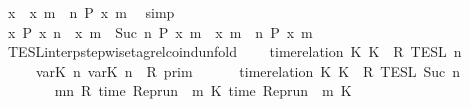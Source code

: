 \begin{isabellebody}
\ {\isacartoucheopen}x\ {\isasymin}\ {\isacharbraceleft}x{\isachardot}\ {\isasymforall}m\ {\isasymge}\ n{\isachardot}\ P\ x\ m{\isacharbraceright}{\isacartoucheclose}\ \isamarkupfalse%
\ simp\isanewline
\ \ \isacommand{{\isacharbraceright}}\isamarkupfalse%
\ \isamarkupfalse%
\ {\isacartoucheopen}{\isacharbraceleft}x{\isachardot}\ P\ x\ n{\isacharbraceright}\ {\isasyminter}\ {\isacharbraceleft}x{\isachardot}\ {\isasymforall}m\ {\isasymge}\ Suc\ n{\isachardot}\ P\ x\ m{\isacharbraceright}\ {\isasymsubseteq}\ {\isacharbraceleft}x{\isachardot}\ {\isasymforall}m\ {\isasymge}\ n{\isachardot}\ P\ x\ m{\isacharbraceright}{\isacartoucheclose}\ \isacommand{{\isachardot}{\isachardot}}\isamarkupfalse%
\isanewline
{}\isamarkupfalse%
%
\endisatagproof
{\isafoldproof}%
%
\isadelimproof
\isanewline
%
\endisadelimproof
\isanewline
{}\isamarkupfalse%
\ TESL{\isacharunderscore}interp{\isacharunderscore}stepwise{\isacharunderscore}tagrel{\isacharunderscore}coind{\isacharunderscore}unfold{\isacharcolon}\isanewline
\ \ \ {\isacartoucheopen}{\isasymlbrakk}\ time{\isacharminus}relation\ {\isasymlfloor}K\ K\ {\isasymin}\ R\ {\isasymrbrakk}\isactrlsub T\isactrlsub E\isactrlsub S\isactrlsub L\isactrlbsup {\isasymge}\ n\isactrlesup \ {\isacharequal}\isanewline
\ \ \ \ {\isasymlbrakk}\ {\isasymlfloor}{\isasymtau}\isactrlsub v\isactrlsub a\isactrlsub r{\isacharparenleft}K\ n{\isacharparenright}{\isacharcomma}\ {\isasymtau}\isactrlsub v\isactrlsub a\isactrlsub r{\isacharparenleft}K\ n{\isacharparenright}{\isasymrfloor}\ {\isasymin}\ R\ {\isasymrbrakk}\isactrlsub p\isactrlsub r\isactrlsub i\isactrlsub m\isanewline
\ \ \ \ {\isasyminter}\ {\isasymlbrakk}\ time{\isacharminus}relation\ {\isasymlfloor}K\ K\ {\isasymin}\ R\ {\isasymrbrakk}\isactrlsub T\isactrlsub E\isactrlsub S\isactrlsub L\isactrlbsup {\isasymge}\ Suc\ n\isactrlesup {\isacartoucheclose}\isanewline
%
\isadelimproof
\ \ %
\endisadelimproof
%
\isatagproof
{}\isamarkupfalse%
\ {\isacharminus}\isanewline
\ \ \ \ \isamarkupfalse%
\ {\isacartoucheopen}{\isacharbraceleft}\ {\isasymrho}{\isachardot}\ {\isasymforall}m{\isasymge}n{\isachardot}\ R\ {\isacharparenleft}time\ {\isacharparenleft}{\isacharparenleft}Rep{\isacharunderscore}run\ {\isasymrho}{\isacharparenright}\ m\ K\ time\ {\isacharparenleft}{\isacharparenleft}Rep{\isacharunderscore}run\ {\isasymrho}{\isacharparenright}\ m\ K\ {\isacharbraceright}\isanewline

\end{isabellebody}
